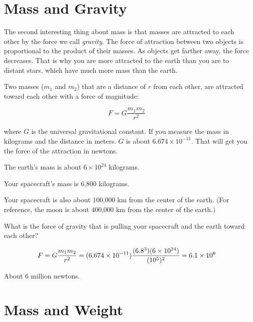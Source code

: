 \section{Mass and Gravity}

The second interesting thing about mass is that masses are
attracted to each other by the force we call \textit{gravity}. The
force of attraction between two objects is proportional to the product
of their masses. As objects get farther away, the force decreases.
That is why you are more attracted to the earth than you are to
distant stars, which have much more mass than the earth.

\begin{mdframed}[style=important, frametitle={Newton's Law of Universal Gravitation}]

Two masses ($m_1$ and $m_2$) that are a distance of
$r$ from each other, are attracted toward each other with a force of
magnitude:

$$F = G\frac{m_1 m_2}{r^2}$$

where $G$ is the universal gravitational constant. If you measure the
mass in kilograms and the distance in meters. $G$ is about $6.674
\times 10^{-11}$.  That will get you the force of the attraction in
newtons.

\end{mdframed}

\begin{Exercise}[title={Gravity}, label=gravity_earth]
  
  The earth's mass is about $6 \times 10^{24}$ kilograms.

  Your spacecraft's mass is 6,800 kilograms.

  Your spacecraft is also about 100,000 km from the center of the earth. (For reference, the moon is about 400,000 km from the center of the earth.)

  What is the force of gravity that is pulling your spacecraft and the earth toward each other?

\end{Exercise}
\begin{Answer}[ref=gravity_earth]

  $$F = G\frac{m_1 m_2}{r^2} = (6.674 \times 10^{-11})\frac{(6.8 \time 10^3)(6 \times 10^{24})}{(10^5)^2} = 6.1 \times 10^{6}$$

  About 6 million newtons.
  
\end{Answer}

\section{Mass and Weight}

